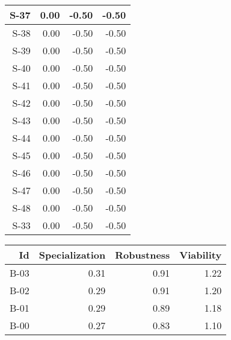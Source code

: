 \begin{tabular}{ | r | r | r | r | }
    \hline
                  S-37  &            0.00  &           -0.50  &           -0.50  \\
    \hline
                  S-38  &            0.00  &           -0.50  &           -0.50  \\
    \hline
                  S-39  &            0.00  &           -0.50  &           -0.50  \\
    \hline
                  S-40  &            0.00  &           -0.50  &           -0.50  \\
    \hline
                  S-41  &            0.00  &           -0.50  &           -0.50  \\
    \hline
                  S-42  &            0.00  &           -0.50  &           -0.50  \\
    \hline
                  S-43  &            0.00  &           -0.50  &           -0.50  \\
    \hline
                  S-44  &            0.00  &           -0.50  &           -0.50  \\
    \hline
                  S-45  &            0.00  &           -0.50  &           -0.50  \\
    \hline
                  S-46  &            0.00  &           -0.50  &           -0.50  \\
    \hline
                  S-47  &            0.00  &           -0.50  &           -0.50  \\
    \hline
                  S-48  &            0.00  &           -0.50  &           -0.50  \\
    \hline
                  S-33  &            0.00  &           -0.50  &           -0.50  \\
    \hline
\end{tabular}


\begin{tabular}{ | r | r | r | r | }
    \hline
                    Id  &  Specialization  &      Robustness  &       Viability  \\
    \hline
    \hline
                  B-03  &            0.31  &            0.91  &            1.22  \\
    \hline
                  B-02  &            0.29  &            0.91  &            1.20  \\
    \hline
                  B-01  &            0.29  &            0.89  &            1.18  \\
    \hline
                  B-00  &            0.27  &            0.83  &            1.10  \\
    \hline
\end{tabular}


